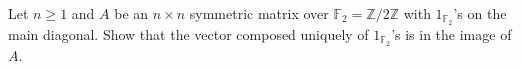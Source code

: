 \begin{problem}
    Let \( n\geq 1 \) and \( A \) be an \( n\times n \) symmetric matrix over \( \mathbb{F}_2 = \mathbb{Z}/2\mathbb{Z} \) with \( 1_{\mathbb{F}_2} \)'s on the main diagonal. Show that the vector composed uniquely of \( 1_{\mathbb{F}_2} \)'s is in the image of \( A \).
\end{problem}
